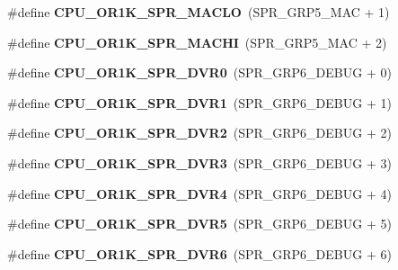 \begin{DoxyCompactItemize}
\item 
\mbox{\label{or1k-utility_8h_a3e1187f7da9d55d947e7c30bd61c1613}} 
\#define {\bfseries C\+P\+U\+\_\+\+O\+R1\+K\+\_\+\+S\+P\+R\+\_\+\+M\+A\+C\+LO}~(S\+P\+R\+\_\+\+G\+R\+P5\+\_\+\+M\+AC + 1)
\item 
\mbox{\label{or1k-utility_8h_a4727abfb07dc72a4d754afb625197c72}} 
\#define {\bfseries C\+P\+U\+\_\+\+O\+R1\+K\+\_\+\+S\+P\+R\+\_\+\+M\+A\+C\+HI}~(S\+P\+R\+\_\+\+G\+R\+P5\+\_\+\+M\+AC + 2)
\item 
\mbox{\label{or1k-utility_8h_ac0db16687a36727cd39a388f3dc30589}} 
\#define {\bfseries C\+P\+U\+\_\+\+O\+R1\+K\+\_\+\+S\+P\+R\+\_\+\+D\+V\+R0}~(S\+P\+R\+\_\+\+G\+R\+P6\+\_\+\+D\+E\+B\+UG + 0)
\item 
\mbox{\label{or1k-utility_8h_a50f1a5b0f0faabed8a872f1fa75d436e}} 
\#define {\bfseries C\+P\+U\+\_\+\+O\+R1\+K\+\_\+\+S\+P\+R\+\_\+\+D\+V\+R1}~(S\+P\+R\+\_\+\+G\+R\+P6\+\_\+\+D\+E\+B\+UG + 1)
\item 
\mbox{\label{or1k-utility_8h_a47486f9e046f7a50ee0b8913c3e55ca3}} 
\#define {\bfseries C\+P\+U\+\_\+\+O\+R1\+K\+\_\+\+S\+P\+R\+\_\+\+D\+V\+R2}~(S\+P\+R\+\_\+\+G\+R\+P6\+\_\+\+D\+E\+B\+UG + 2)
\item 
\mbox{\label{or1k-utility_8h_a35a8a0742d2af176b48dc6376c98c7b4}} 
\#define {\bfseries C\+P\+U\+\_\+\+O\+R1\+K\+\_\+\+S\+P\+R\+\_\+\+D\+V\+R3}~(S\+P\+R\+\_\+\+G\+R\+P6\+\_\+\+D\+E\+B\+UG + 3)
\item 
\mbox{\label{or1k-utility_8h_a7450b4cb4b0a3191196cc657d6e55fde}} 
\#define {\bfseries C\+P\+U\+\_\+\+O\+R1\+K\+\_\+\+S\+P\+R\+\_\+\+D\+V\+R4}~(S\+P\+R\+\_\+\+G\+R\+P6\+\_\+\+D\+E\+B\+UG + 4)
\item 
\mbox{\label{or1k-utility_8h_a8292480a7e1d65e3376868fb6309d5df}} 
\#define {\bfseries C\+P\+U\+\_\+\+O\+R1\+K\+\_\+\+S\+P\+R\+\_\+\+D\+V\+R5}~(S\+P\+R\+\_\+\+G\+R\+P6\+\_\+\+D\+E\+B\+UG + 5)
\item 
\mbox{\label{or1k-utility_8h_af0077165a784670d6581b062223b2b00}} 
\#define {\bfseries C\+P\+U\+\_\+\+O\+R1\+K\+\_\+\+S\+P\+R\+\_\+\+D\+V\+R6}~(S\+P\+R\+\_\+\+G\+R\+P6\+\_\+\+D\+E\+B\+UG + 6)

\end{DoxyCompactItemize}
